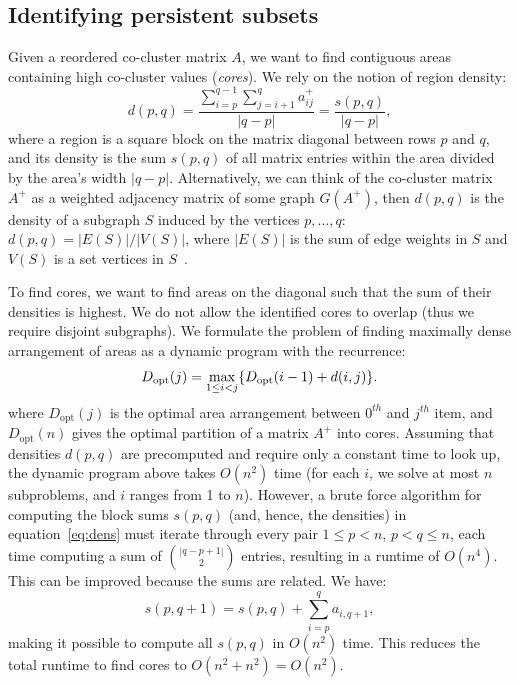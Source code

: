 \documentclass[12pt]{cmuthesis}
\begin{document}
  \subsection{Identifying persistent subsets}
  \label{sec:dense_sub}

  Given a reordered co-cluster matrix $A$, we want to find contiguous areas containing high co-cluster values (\textit{cores}). We rely on the notion of region density:
  \begin{equation}\label{eq:dens}
    d(p, q) = \frac{ \sum_{i=p}^{q-1} \sum_{j=i+1}^{q} a^{+}_{ij}}{ |q-p|} =
    \frac{s(p,q)}{ |q-p|},
  \end{equation}
  where a region is a square block on the matrix diagonal between rows $p$ and $q$, and its density is the sum $s(p, q)$ of all matrix entries within the area divided by the area's width $|q-p|$. Alternatively, we can think of the co-cluster matrix $A^{+}$ as a weighted adjacency matrix of some graph $G(A^{+})$, then $d(p,q)$ is the density of a subgraph $S$ induced by the vertices $p, \ldots, q$: $d(p,q) = |E(S)| / |V(S)|$, where $|E(S)|$ is the sum of edge weights in $S$ and $V(S)$ is a set vertices in $S$~\cite{Saha}.

  To find cores, we want to find areas on the diagonal such that the sum of their densities is highest. We do not allow the identified cores to overlap (thus we require disjoint subgraphs). We formulate the problem of finding maximally dense arrangement of areas as a dynamic program with the recurrence:
  \[
    D_{\textrm{\scriptsize opt}}(j) = \max_{1 \leq i < j}
            \{D_{\textrm{\scriptsize opt}}(i - 1) + d(i,j)\}.
  \]
  where $D_{\textrm{opt}}(j)$ is the optimal area arrangement between $0^{th}$ and $j^{th}$ item, and $D_{\textrm{opt}}(n)$ gives the optimal partition of a matrix $A^{+}$ into cores. Assuming that densities $d(p, q)$ are precomputed and require only a constant time to look up, the dynamic program above takes $O(n^2)$ time (for each $i$, we solve at most $n$ subproblems, and $i$ ranges from 1 to $n$). However, a brute force algorithm for computing the block sums $s(p,q)$ (and, hence, the densities) in equation~\ref{eq:dens} must iterate through every pair $1 \leq p < n$, $p < q \leq n$, each time computing a sum of ${|q-p+1| \choose 2}$ entries, resulting in  a runtime of $O(n^4)$. This can be improved because the sums are related. We have:
  \[
   s(p, q+1) = s(p, q) + \sum_{i = p}^{q} a_{i, q+1},
   \]
  making it possible to compute all $s(p,q)$ in $O(n^{2})$ time. This reduces the total runtime to find cores to $O(n^2 + n^2) = O(n^2)$.
\end{document}
